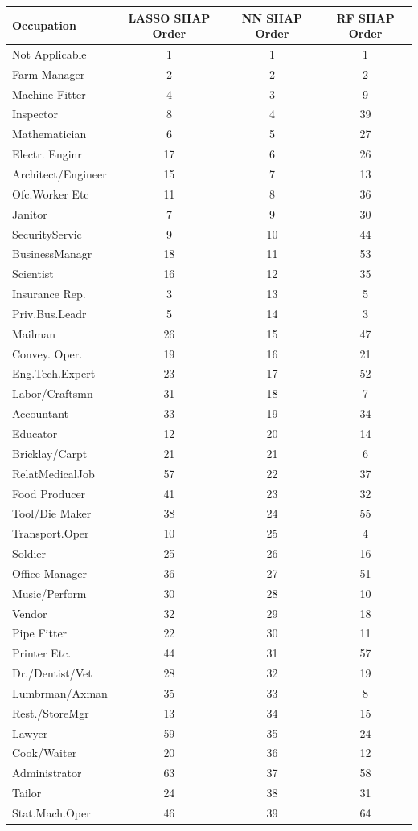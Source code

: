 \begin{tabular}{lccc}
\hline\hline
Occupation & LASSO SHAP Order & NN SHAP Order & RF SHAP Order \\
\hline
Not Applicable&1&1&1\\
Farm Manager&2&2&2\\
Machine Fitter&4&3&9\\
Inspector&8&4&39\\
Mathematician&6&5&27\\
Electr. Enginr&17&6&26\\
Architect/Engineer&15&7&13\\
Ofc.Worker Etc&11&8&36\\
Janitor&7&9&30\\
SecurityServic&9&10&44\\
BusinessManagr&18&11&53\\
Scientist&16&12&35\\
Insurance Rep.&3&13&5\\
Priv.Bus.Leadr&5&14&3\\
Mailman&26&15&47\\
Convey. Oper.&19&16&21\\
Eng.Tech.Expert&23&17&52\\
Labor/Craftsmn&31&18&7\\
Accountant&33&19&34\\
Educator&12&20&14\\
Bricklay/Carpt&21&21&6\\
RelatMedicalJob&57&22&37\\
Food Producer&41&23&32\\
Tool/Die Maker&38&24&55\\
Transport.Oper&10&25&4\\
Soldier&25&26&16\\
Office Manager&36&27&51\\
Music/Perform&30&28&10\\
Vendor&32&29&18\\
Pipe Fitter&22&30&11\\
Printer Etc.&44&31&57\\
Dr./Dentist/Vet&28&32&19\\
Lumbrman/Axman&35&33&8\\
Rest./StoreMgr&13&34&15\\
Lawyer&59&35&24\\
Cook/Waiter&20&36&12\\
Administrator&63&37&58\\
Tailor&24&38&31\\
Stat.Mach.Oper&46&39&64\\

\end{tabular}
